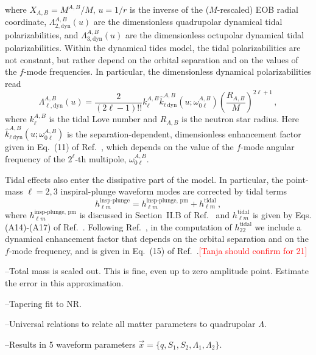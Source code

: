 \documentclass[prd,aps,letter,twocolumn,floatfix,notitlepage]{revtex4-1}
\newcommand{\red}[1]{\textcolor{red}{#1}}
\begin{document}
where $X_{A,B}=M^{A,B}/M$, $u=1/r$ is the inverse of the ($M$-rescaled) EOB radial coordinate, $\Lambda_{2,\textrm{dyn}}^{A,B}(u)$ are the dimensionless quadrupolar dynamical tidal polarizabilities, and $\Lambda_{3,\textrm{dyn}}^{A,B}(u)$ are the dimensionless octupolar dynamical tidal polarizabilities. Within the dynamical tides model, the tidal polarizabilities are not constant, but rather depend on the orbital separation and on the values of the $f$-mode frequencies. In particular, the dimensionless dynamical polarizabilities read
\begin{equation}
\Lambda_{\ell,\textrm{dyn}}^{A,B}(u)=\frac{2}{(2\ell-1)!!}k^{A,B}_{\ell}\hat{k}^{A,B}_{\ell\,\textrm{dyn}}(u;\omega_{0\ell}^{A,B})\left(\frac{R_{A,B}}{M}\right)^{2\ell+1}\,,
\end{equation}
where $k^{A,B}_{\ell}$ is the tidal Love number and $R_{A,B}$ is the neutron star radius. Here $\hat{k}^{A,B}_{\ell\,\textrm{dyn}}(u;\omega_{0\ell}^{A,B})$ is the separation-dependent, dimensionless enhancement factor given in Eq.~(11) of Ref.~\cite{Dietrich:2017feu}, which depends on the value of the $f$-mode angular frequency of the $2^\ell$-th multipole, $\omega_{0\ell}^{A,B}$. 

Tidal effects also enter the dissipative part of the model. In particular, the point-mass $\ell=2,3$ inspiral-plunge waveform modes are corrected by tidal terms
\begin{equation}
h_{\ell m}^{\textrm{insp-plunge}} = h_{\ell m}^{\textrm{insp-plunge, pm}} + h_{\ell m}^{\textrm{tidal}}\,,
\end{equation} 
where $h_{\ell m}^{\textrm{insp-plunge, pm}}$ is discussed in Section~II.B of Ref.~\cite{Bohe:2016gbl} and $h_{\ell m}^{\textrm{tidal}}$ is given by Eqs. (A14)-(A17) of Ref.~\cite{Damour:2012yf}. Following Ref.~\cite{Dietrich:2017feu}, in the computation of $h_{22}^{\textrm{tidal}}$ we include a dynamical enhancement factor that depends on the orbital separation and on the $f$-mode frequency, and is given in Eq.~(15) of Ref.~\cite{Dietrich:2017feu}.\red{[Tanja should confirm for 21]}


--Total mass is scaled out. This is fine, even up to zero amplitude point. Estimate the error in this approximation.

--Tapering fit to NR.

--Universal relations to relate all matter parameters to quadrupolar $\Lambda$.

--Results in 5 waveform parameters $\vec x=\{q, S_1, S_2, \Lambda_1, \Lambda_2\}$.
\end{document}
